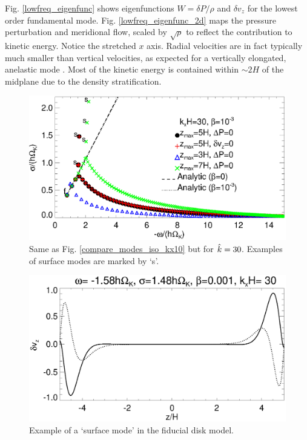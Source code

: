 Fig. \ref{lowfreq_eigenfunc} shows 
eigenfunctions $W = \delta P/\rho$ and $\delta   v_z$ for the lowest order fundamental mode.  
Fig. \ref{lowfreq_eigenfunc_2d} maps the pressure perturbation and meridional flow,
scaled by $\sqrt{\rho}$ to reflect the contribution to kinetic
energy. Notice the stretched $x$ axis. Radial velocities are in fact typically much 
smaller than vertical velocities, as expected for a vertically
elongated, anelastic mode . Most of the kinetic
energy is contained within $\sim 2H$ of the midplane due to the
density stratification.  

\begin{figure}
  \includegraphics[width=\linewidth]{figures/compare_modes_iso_kx30_analytic.ps}
  \caption{Same as Fig. \ref{compare_modes_iso_kx10} but for
    $\hat{k}=30$. Examples of surface modes are 
    marked by `s'. \label{compare_modes_iso_kx30}
  }
\end{figure}


\begin{figure}
  \includegraphics[width=\linewidth,clip=true,trim=0cm 0cm 0cm
  0cm]{figures/eigenvectorvz_iso_surf}
  \caption{Example of a `surface mode' in the fiducial disk model.
    \label{lowfreq_eigenfunc_surf}
  }
\end{figure}

